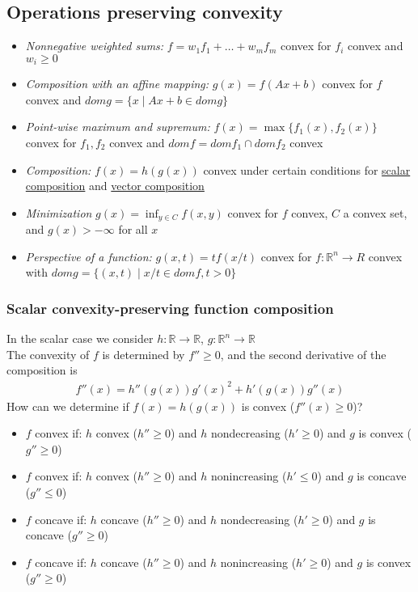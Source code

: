 \documentclass{article}
\begin{document}
\subsection{Operations preserving convexity}
\begin{itemize}
  \item \textit{Nonnegative weighted sums:} $f = w_1f_1 + \dots + w_mf_m$ convex for $f_i$ convex and $w_i \geq 0$
  \item \textit{Composition with an affine mapping:} $g(x) = f(Ax + b)$ convex for $f$ convex and $dom g = \{x \mid Ax + b \in dom g \}$
  \item \textit{Point-wise maximum and supremum:} $f(x) = \max\{f_1(x),f_2(x)\}$ convex for $f_1,f_2$ convex and $dom f = dom f_1 \cap dom f_2$ convex
  \item \textit{Composition:} $f(x) = h(g(x))$ convex under certain conditions for \hyperref[scalarComp]{scalar composition} and \hyperref[vectorComp]{vector composition}
  \item \textit{Minimization} $g(x) = \inf_{y \in C} f(x, y)$ convex for $f$ convex, $C$ a convex set, and $g(x) > -\infty$ for all $x$
  \item \textit{Perspective of a function:} $g(x, t) = tf(x/t)$ convex for $f:\mathbb{R}^n \rightarrow R$ convex with $dom g = \{(x,t) \mid x/t \in dom f, t > 0\}$
\end{itemize}


\subsubsection{Scalar convexity-preserving function composition}\label{scalarComp}
In the scalar case we consider $h:\mathbb{R} \rightarrow \mathbb{R}$, $g:\mathbb{R}^n \rightarrow \mathbb{R}$\\
The convexity of $f$ is determined by $f'' \geq 0$, and the second derivative of the composition is
\begin{align*}
  f''(x) = h''(g(x))g'(x)^2 + h'(g(x))g''(x)
\end{align*}
How can we determine if $f(x) = h(g(x))$ is convex ($f''(x) \geq 0$)?
\begin{itemize}
  \item $f$ convex if: $h$ convex ($h'' \geq 0$) and $h$ nondecreasing ($h' \geq 0$) and $g$ is convex ($g'' \geq 0$)
  \item $f$ convex if: $h$ convex ($h'' \geq 0$) and $h$ nonincreasing ($h' \leq 0$) and $g$ is concave ($g'' \leq 0$)
  \item $f$ concave if: $h$ concave ($h'' \geq 0$) and $h$ nondecreasing ($h' \geq 0$) and $g$ is concave ($g'' \geq 0$)
  \item $f$ concave if: $h$ concave ($h'' \geq 0$) and $h$ nonincreasing ($h' \geq 0$) and $g$ is convex ($g'' \geq 0$)
\end{itemize}
\end{document}
